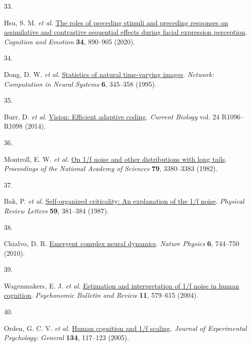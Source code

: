 \documentclass[
]{article}
\newlength{\cslhangindent}
\newlength{\csllabelwidth}
\newlength{\cslentryspacingunit} %
\newenvironment{CSLReferences}[2] %
 {%
  \setlength{\parindent}{0pt}
  \ifodd #1
  \let\oldpar\par
  \def\par{\hangindent=\cslhangindent\oldpar}
  \fi
  \setlength{\parskip}{#2\cslentryspacingunit}
 }%
 {}
\newcommand{\CSLLeftMargin}[1]{\parbox[t]{\csllabelwidth}{#1}}
\newcommand{\CSLRightInline}[1]{\parbox[t]{\linewidth - \csllabelwidth}{#1}\break}
\begin{document}
\begin{CSLReferences}{0}{0}
\leavevmode{}%
\CSLLeftMargin{33. }%
\CSLRightInline{Hsu, S. M. \emph{et al.}
\href{https://doi.org/10.1080/02699931.2019.1696752}{The roles of
preceding stimuli and preceding responses on assimilative and
contrastive sequential effects during facial expression perception}.
\emph{Cognition and Emotion} \textbf{34}, 890--905 (2020).}

\leavevmode{}%
\CSLLeftMargin{34. }%
\CSLRightInline{Dong, D. W. \emph{et al.}
\href{https://doi.org/10.1088/0954-898X_6_3_003}{Statistics of natural
time-varying images}. \emph{Network: Computation in Neural Systems}
\textbf{6}, 345--358 (1995).}

\leavevmode{}%
\CSLLeftMargin{35. }%
\CSLRightInline{Burr, D. \emph{et al.}
\href{https://doi.org/10.1016/j.cub.2014.10.002}{Vision: Efficient
adaptive coding}. \emph{Current Biology} vol. 24 R1096--R1098 (2014).}

\leavevmode{}%
\CSLLeftMargin{36. }%
\CSLRightInline{Montroll, E. W. \emph{et al.}
\href{https://doi.org/10.1073/pnas.79.10.3380}{On 1/f noise and other
distributions with long tails}. \emph{Proceedings of the National
Academy of Sciences} \textbf{79}, 3380--3383 (1982).}

\leavevmode{}%
\CSLLeftMargin{37. }%
\CSLRightInline{Bak, P. \emph{et al.}
\href{https://doi.org/10.1103/PhysRevLett.59.381}{Self-organized
criticality: An explanation of the 1/f noise}. \emph{Physical Review
Letters} \textbf{59}, 381--384 (1987).}

\leavevmode{}%
\CSLLeftMargin{38. }%
\CSLRightInline{Chialvo, D. R.
\href{https://doi.org/10.1038/nphys1803}{Emergent complex neural
dynamics}. \emph{Nature Physics} \textbf{6}, 744--750 (2010).}

\leavevmode{}%
\CSLLeftMargin{39. }%
\CSLRightInline{Wagenmakers, E. J. \emph{et al.}
\href{https://doi.org/10.3758/BF03196615}{Estimation and interpretation
of 1/f noise in human cognition}. \emph{Psychonomic Bulletin and Review}
\textbf{11}, 579--615 (2004).}

\leavevmode{}%
\CSLLeftMargin{40. }%
\CSLRightInline{Orden, G. C. V. \emph{et al.}
\href{https://doi.org/10.1037/0096-3445.134.1.117}{Human cognition and
1/f scaling}. \emph{Journal of Experimental Psychology: General}
\textbf{134}, 117--123 (2005).}


\end{CSLReferences}
\end{document}
